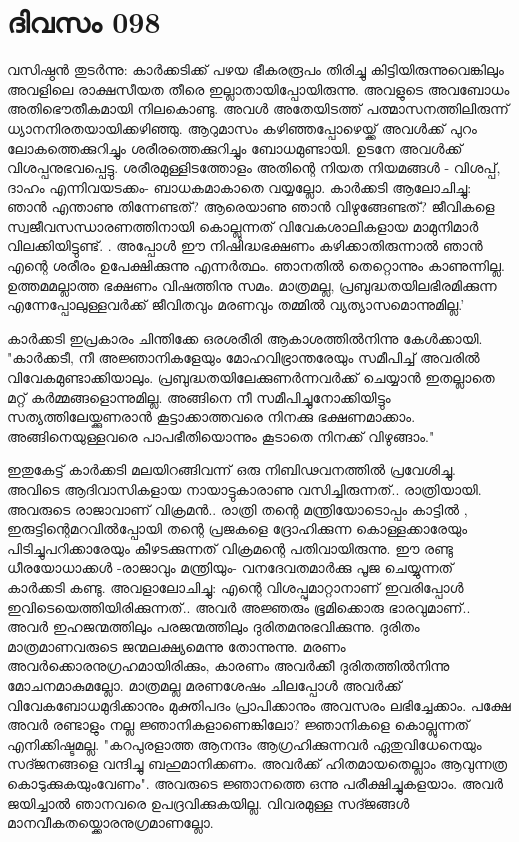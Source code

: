 \newpage
\section{ദിവസം 098}


വസിഷ്ഠന്‍ തുടര്‍ന്നു: കാര്‍ക്കടിക്ക്‌ പഴയ ഭീകരരൂപം തിരിച്ചു കിട്ടിയിരുന്നുവെങ്കിലും അവളിലെ രാക്ഷസീയത തീരെ ഇല്ലാതായിപ്പോയിരുന്നു. അവളുടെ അവബോധം അതിഭൌതീകമായി നിലകൊണ്ടു. അവള്‍ അതേയിടത്ത്‌ പത്മാസനത്തിലിരുന്ന് ധ്യാനനിരതയായിക്കഴിഞ്ഞു. ആറുമാസം കഴിഞ്ഞപ്പോഴെയ്ക്ക്‌ അവള്‍ക്ക്‌ പുറം ലോകത്തെക്കുറിച്ചും ശരീരത്തെക്കുറിച്ചും ബോധമുണ്ടായി. ഉടനേ അവള്‍ക്ക്‌ വിശപ്പനുഭവപ്പെട്ടു. ശരീരമുള്ളിടത്തോളം അതിന്റെ നിയത നിയമങ്ങള്‍ - വിശപ്പ്‌, ദാഹം എന്നിവയടക്കം- ബാധകമാകാതെ വയ്യല്ലോ. കാര്‍ക്കടി ആലോചിച്ചു: ഞാന്‍ എന്താണു തിന്നേണ്ടത്‌? ആരെയാണു ഞാന്‍ വിഴുങ്ങേണ്ടത്‌? ജീവികളെ സ്വജീവസന്ധാരണത്തിനായി കൊല്ലുന്നത്‌ വിവേകശാലികളായ മാമുനിമാര്‍ വിലക്കിയിട്ടുണ്ട്‌. . അപ്പോള്‍ ഈ നിഷിദ്ധഭക്ഷണം കഴിക്കാതിരുന്നാല്‍ ഞാന്‍ എന്റെ ശരീരം ഉപേക്ഷിക്കുന്നു എന്നര്‍ത്ഥം. ഞാനതില്‍ തെറ്റൊന്നും കാണുന്നില്ല. ഉത്തമമല്ലാത്ത ഭക്ഷണം വിഷത്തിനു സമം. മാത്രമല്ല, പ്രബുദ്ധതയിലഭിരമിക്കുന്ന എന്നേപ്പോലുള്ളവര്‍ക്ക്‌ ജീവിതവും മരണവും തമ്മില്‍ വ്യത്യാസമൊന്നുമില്ല.'

കാര്‍ക്കടി ഇപ്രകാരം ചിന്തിക്കേ ഒരശരീരി ആകാശത്തില്‍നിന്നു കേള്‍ക്കായി. "കാര്‍ക്കടീ, നീ അജ്ഞാനികളേയും മോഹവിഭ്രാന്തരേയും സമീപിച്ച്‌ അവരില്‍ വിവേകമുണ്ടാക്കിയാലും. പ്രബുദ്ധതയിലേക്കുണര്‍ന്നവര്‍ക്ക്‌ ചെയ്യാന്‍ ഇതല്ലാതെ മറ്റ്‌ കര്‍മ്മങ്ങളൊന്നുമില്ല. അങ്ങിനെ നീ സമീപിച്ചുനോക്കിയിട്ടും സത്യത്തിലേയ്ക്കുണരാന്‍ കൂട്ടാക്കാത്തവരെ നിനക്കു ഭക്ഷണമാക്കാം. അങ്ങിനെയുള്ളവരെ പാപഭീതിയൊന്നും കൂടാതെ നിനക്ക്‌ വിഴുങ്ങാം." 

ഇതുകേട്ട്‌ കാര്‍ക്കടി മലയിറങ്ങിവന്ന് ഒരു നിബിഢവനത്തില്‍ പ്രവേശിച്ചു. അവിടെ ആദിവാസികളായ നായാട്ടുകാരാണു വസിച്ചിരുന്നത്‌.. രാത്രിയായി. അവരുടെ രാജാവാണ്‌ വിക്രമന്‍.. രാത്രി തന്റെ മന്ത്രിയോടൊപ്പം കാട്ടില്‍ , ഇരുട്ടിന്റെമറവില്‍പ്പോയി തന്റെ പ്രജകളെ ദ്രോഹിക്കുന്ന കൊള്ളക്കാരേയും പിടിച്ചുപറിക്കാരേയും കീഴടക്കുന്നത്‌ വിക്രമന്റെ പതിവായിരുന്നു. ഈ രണ്ടു ധീരയോധാക്കള്‍ -രാജാവും മന്ത്രിയും- വനദേവതമാര്‍ക്കു പൂജ ചെയ്യുന്നത്‌ കാര്‍ക്കടി കണ്ടു. അവളാലോചിച്ചു: എന്റെ വിശപ്പുമാറ്റാനാണ്‌ ഇവരിപ്പോള്‍ ഇവിടെയെത്തിയിരിക്കുന്നത്‌.. അവര്‍ അജ്ഞരും ഭൂമിക്കൊരു ഭാരവുമാണ്‌.. അവര്‍ ഇഹജന്മത്തിലും പരജന്മത്തിലും ദുരിതമനുഭവിക്കുന്നു. ദുരിതം മാത്രമാണവരുടെ ജന്മലക്ഷ്യമെന്നു തോന്നുന്നു. മരണം അവര്‍ക്കൊരനുഗ്രഹമായിരിക്കും, കാരണം അവര്‍ക്കീ ദുരിതത്തില്‍നിന്നു മോചനമാകുമല്ലോ. മാത്രമല്ല മരണശേഷം ചിലപ്പോള്‍ അവര്‍ക്ക്‌ വിവേകബോധമുദിക്കാനും മുക്തിപദം പ്രാപിക്കാനും അവസരം ലഭിച്ചേക്കാം. പക്ഷേ അവര്‍ രണ്ടാളും നല്ല ജ്ഞാനികളാണെങ്കിലോ? ജ്ഞാനികളെ കൊല്ലുന്നത്‌ എനിക്കിഷ്ടമല്ല. "കറപുരളാത്ത ആനന്ദം ആഗ്രഹിക്കുന്നവര്‍ ഏതുവിധേനെയും സദ്ജനങ്ങളെ വന്ദിച്ചു ബഹുമാനിക്കണം. അവര്‍ക്ക്‌ ഹിതമായതെല്ലാം ആവുന്നത്ര കൊടുക്കുകയുംവേണം". അവരുടെ ജ്ഞാനത്തെ ഒന്നു പരീക്ഷിച്ചുകളയാം. അവര്‍ ജയിച്ചാല്‍ ഞാനവരെ ഉപദ്രവിക്കുകയില്ല. വിവരമുള്ള സദ്ജങ്ങള്‍ മാനവീകതയ്ക്കൊരനുഗ്രമാണല്ലോ.

